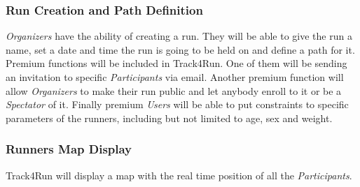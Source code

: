 \documentclass[../../rasd.tex]{subfiles}
\begin{document}
				\subsubsection{Run Creation and Path Definition}
				\textit{Organizers} have the ability of creating a run. They will be able to give the run a name, set a date and time the run is going to be held on and define a path for it. Premium functions will be included in Track4Run. One of them will be sending an invitation to specific \textit{Participants} via email. Another premium function will allow \textit{Organizers} to make their run public and let anybody enroll to it or be a \textit{Spectator} of it. Finally premium \textit{Users} will be able to put constraints to specific parameters of the runners, including but not limited to age, sex and weight.
				
				\subsubsection{Runners Map Display}

				Track4Run will display a map with the real time position of all the \textit{Participants}. 
\end{document}
